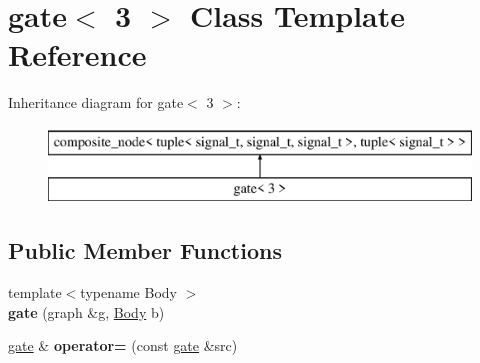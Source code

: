 \hypertarget{classgate_3_013_01_4}{}\section{gate$<$ 3 $>$ Class Template Reference}
\label{classgate_3_013_01_4}
Inheritance diagram for gate$<$ 3 $>$\+:\begin{figure}[H]
\begin{center}
\leavevmode
\includegraphics[height=2.000000cm]{classgate_3_013_01_4}
\end{center}
\end{figure}
\subsection*{Public Member Functions}
\begin{DoxyCompactItemize}
\item 
\hypertarget{classgate_3_013_01_4_a1f26c5ae0786a4e981e3579e098c0129}{}{\footnotesize template$<$typename Body $>$ }\\{\bfseries gate} (graph \&g, \hyperlink{classBody}{Body} b)\label{classgate_3_013_01_4_a1f26c5ae0786a4e981e3579e098c0129}

\item 
\hypertarget{classgate_3_013_01_4_a4f22bc89bddaf3b354f600a0f271bb74}{}\hyperlink{classgate}{gate} \& {\bfseries operator=} (const \hyperlink{classgate}{gate} \&src)\label{classgate_3_013_01_4_a4f22bc89bddaf3b354f600a0f271bb74}

\end{DoxyCompactItemize}
